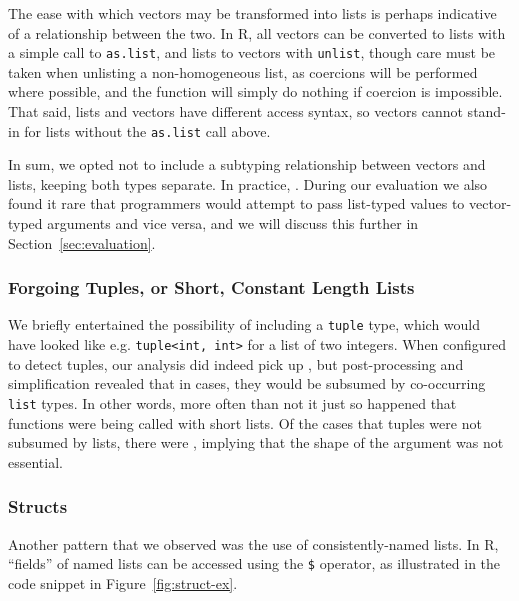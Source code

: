 \documentclass[acmsmall,review,anonymous]{acmart}\settopmatter{printfolios=true,printccs=false,printacmref=false}
\newcommand{\code}[1]{{\lstinline[style=Rin]!#1!}\xspace}
\begin{document}
The ease with which vectors may be transformed into lists is perhaps indicative of a relationship between the two.
In R, all vectors can be converted to lists with a simple call to \code{as.list}, and lists to vectors with \code{unlist}, though care must be taken when unlisting a non-homogeneous list, as coercions will be performed where possible, and the function will simply do nothing if coercion is impossible.
That said, lists and vectors have different access syntax, so vectors cannot stand-in for lists without the \code{as.list} call above.

In sum, we opted not to include a subtyping relationship between vectors and lists, keeping both types separate.
In practice, \AT{how often do \code{T[] | list<T>} types occur?}.
During our evaluation we also found it rare that programmers would attempt to pass list-typed values to vector-typed arguments and vice versa, and we will discuss this further in Section~\ref{sec:evaluation}.

%
%
\subsubsection{Forgoing Tuples, or Short, Constant Length Lists}

We briefly entertained the possibility of including a \code{tuple} type, which would have looked like e.g. \code{tuple<int, int>} for a list of two integers.  
When configured to detect tuples, our analysis did indeed pick up , but post-processing and simplification revealed that in  cases, they would be subsumed by co-occurring \code{list} types.
In other words, more often than not it just so happened that functions were being called with short lists.  
Of the cases that tuples were not subsumed by lists,  there were , implying that the shape of the argument was not essential.


%
%
\subsubsection{Structs}

Another pattern that we observed was the use of consistently-named lists.
In R, ``fields'' of named lists can be accessed using the \code{$} operator, as illustrated in the code snippet in Figure~\ref{fig:struct-ex}.
\end{document}
